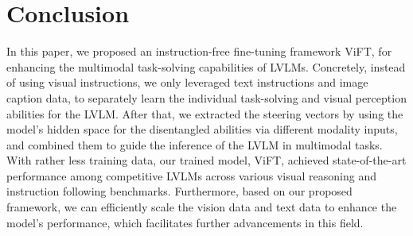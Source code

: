 \section{Conclusion}
\label{sec:conclusion}

In this paper, we proposed an instruction-free fine-tuning framework ViFT, for enhancing the multimodal task-solving capabilities of LVLMs. Concretely, instead of using visual instructions, we only leveraged text instructions and image caption data, to separately learn the individual task-solving and visual perception abilities for the LVLM.
After that, we extracted the steering vectors by using the model's hidden space for the disentangled abilities via different modality inputs, and combined them to guide the inference of the LVLM in multimodal tasks.
With rather less training data, our trained model, ViFT, achieved state-of-the-art performance among competitive LVLMs across various visual reasoning and instruction following benchmarks. Furthermore, based on our proposed framework, we can efficiently scale the vision data and text data to enhance the model's performance, which facilitates further advancements in this field.



